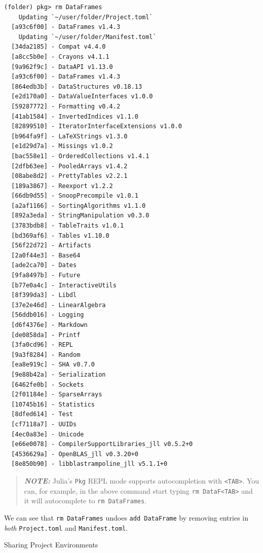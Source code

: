 \documentclass[
  notoc %
]{tufte-book}
\makeatletter
\newcommand{\passthrough}[1]{#1}
\renewcommand\subsubsection{%
\@startsection{subsubsection}{3}{\z@ }{-3.25ex\@plus -1ex \@minus -.2ex}{1.5ex \@plus .2ex}{\normalfont \normalsize \bfseries }
}
\makeatother
\begin{document}
\begin{lstlisting}
(folder) pkg> rm DataFrames
    Updating `~/user/folder/Project.toml`
  [a93c6f00] - DataFrames v1.4.3
    Updating `~/user/folder/Manifest.toml`
  [34da2185] - Compat v4.4.0
  [a8cc5b0e] - Crayons v4.1.1
  [9a962f9c] - DataAPI v1.13.0
  [a93c6f00] - DataFrames v1.4.3
  [864edb3b] - DataStructures v0.18.13
  [e2d170a0] - DataValueInterfaces v1.0.0
  [59287772] - Formatting v0.4.2
  [41ab1584] - InvertedIndices v1.1.0
  [82899510] - IteratorInterfaceExtensions v1.0.0
  [b964fa9f] - LaTeXStrings v1.3.0
  [e1d29d7a] - Missings v1.0.2
  [bac558e1] - OrderedCollections v1.4.1
  [2dfb63ee] - PooledArrays v1.4.2
  [08abe8d2] - PrettyTables v2.2.1
  [189a3867] - Reexport v1.2.2
  [66db9d55] - SnoopPrecompile v1.0.1
  [a2af1166] - SortingAlgorithms v1.1.0
  [892a3eda] - StringManipulation v0.3.0
  [3783bdb8] - TableTraits v1.0.1
  [bd369af6] - Tables v1.10.0
  [56f22d72] - Artifacts
  [2a0f44e3] - Base64
  [ade2ca70] - Dates
  [9fa8497b] - Future
  [b77e0a4c] - InteractiveUtils
  [8f399da3] - Libdl
  [37e2e46d] - LinearAlgebra
  [56ddb016] - Logging
  [d6f4376e] - Markdown
  [de0858da] - Printf
  [3fa0cd96] - REPL
  [9a3f8284] - Random
  [ea8e919c] - SHA v0.7.0
  [9e88b42a] - Serialization
  [6462fe0b] - Sockets
  [2f01184e] - SparseArrays
  [10745b16] - Statistics
  [8dfed614] - Test
  [cf7118a7] - UUIDs
  [4ec0a83e] - Unicode
  [e66e0078] - CompilerSupportLibraries_jll v0.5.2+0
  [4536629a] - OpenBLAS_jll v0.3.20+0
  [8e850b90] - libblastrampoline_jll v5.1.1+0
\end{lstlisting}

\begin{quote}
\textbf{\emph{NOTE:}} Julia's \passthrough{\lstinline!Pkg!} REPL mode
supports autocompletion with \passthrough{\lstinline!<TAB>!}. You can,
for example, in the above command start typing
\passthrough{\lstinline!rm DataF<TAB>!} and it will autocomplete to
\passthrough{\lstinline!rm DataFrames!}.
\end{quote}

We can see that \passthrough{\lstinline!rm DataFrames!} undoes
\passthrough{\lstinline!add DataFrame!} by removing entries in
\emph{both} \passthrough{\lstinline!Project.toml!} and
\passthrough{\lstinline!Manifest.toml!}.

\hypertarget{sec:project_management_sharing}{%
\subsubsection{Sharing Project
Environments}\label{sec:project_management_sharing}}
\end{document}

